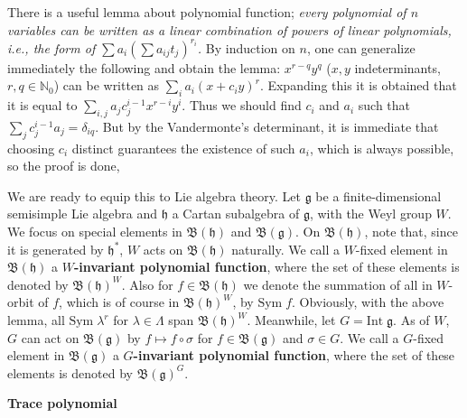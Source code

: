 \documentclass{article}
\newcommand{\NaN}{\mathbb{N}}
\newcommand{\lie}[1]{\mathfrak{#1}}
\begin{document}
There is a useful lemma about polynomial function; \textit{every polynomial of $n$ variables can be written as a linear combination of powers of linear polynomials, i.e., the form of $\sum a_i (\sum a_{ij} t_j)^{r_i}$.}
By induction on $n$, one can generalize immediately the following and obtain the lemma: $x^{r - q} y^q$ ($x, y$ indeterminants, $r, q \in \NaN_0$) can be written as $\sum_i a_i(x + c_i y)^r$.
Expanding this it is obtained that it is equal to $\sum_{i, j} a_j c_j^{i - 1} x^{r - i} y^i$.
Thus we should find $c_i$ and $a_i$ such that $\sum_j c_j^{i - 1} a_j = \delta_{iq}$.
But by the Vandermonte's determinant, it is immediate that choosing $c_i$ distinct guarantees the existence of such $a_i$, which is always possible, so the proof is done,

We are ready to equip this to Lie algebra theory.
Let $\lie{g}$ be a finite-dimensional semisimple Lie algebra and $\lie{h}$ a Cartan subalgebra of $\lie{g}$, with the Weyl group $W$.
We focus on special elements in $\mathfrak{B}(\lie{h})$ and $\mathfrak{B}(\lie{g})$.
On $\mathfrak{B}(\lie{h})$, note that, since it is generated by $\lie{h}^*$, $W$ acts on $\mathfrak{B}(\lie{h})$ naturally.
We call a $W$-fixed element in $\mathfrak{B}(\lie{h})$ a \textbf{$W$-invariant polynomial function}, where the set of these elements is denoted by $\mathfrak{B}(\lie{h})^W$.
Also for $f \in \mathfrak{B}(\lie{h})$ we denote the summation of all in $W$-orbit of $f$, which is of course in $\mathfrak{B}(\lie{h})^W$, by $\textrm{Sym}\; f$.
Obviously, with the above lemma, all $\textrm{Sym}\; \lambda^r$ for $\lambda \in \Lambda$ span $\mathfrak{B}(\lie{h})^W$.
Meanwhile, let $G = \textrm{Int}\; \lie{g}$.
As of $W$, $G$ can act on $\mathfrak{B}(\lie{g})$ by $f \mapsto f \circ \sigma$ for $f \in \mathfrak{B}(\lie{g})$ and $\sigma \in G$.
We call a $G$-fixed element in $\mathfrak{B}(\lie{g})$ a \textbf{$G$-invariant polynomial function}, where the set of these elements is denoted by $\mathfrak{B}(\lie{g})^G$.

\newpage

\textbf{Trace polynomial}
\end{document}
